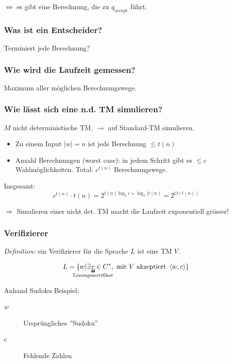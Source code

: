$\Leftrightarrow$ es gibt eine Berechnung, die zu $q_\text{accept}$ führt.

\subsubsection{Was ist ein Entscheider?}

Terminiert jede Berechnung?


\subsubsection{Wie wird die Laufzeit gemessen?}

Maximum aller möglichen Berechnungswege.

\subsubsection{Wie lässt sich eine n.d. TM simulieren?}

$M$ nicht deterministische TM. $\longrightarrow$ auf Standard-TM simulieren.


\begin{itemize}
	\item Zu einem Input $|w| = n$ ist jede Berechnung $\leq t(n)$
	\item Anzahl Berechnungen (worst case): in jedem Schritt gibt es $\leq c$ Wahlmöglichkeiten. Total: $c^{t(n)}$ Berechnungswege.
\end{itemize}

Insgesamt: \[
	c^{t(n)} \cdot t(n) = 2^{t(n) \log_2 c + \log_2(t(n)} = 2^{O(t(n))}
\]

$\Rightarrow$ Simulieren einer nicht det. TM macht die Laufzeit exponentiell grösser!

\subsubsection{Verifizierer}

\emph{Definition:} ein Verifizierer für die Sprache $L$ ist eine TM $V$.

\[
	L = \{ w | \exists \underbracket{c}_{\mathclap{\text{Lösungszertifikat}}} \in C^\ast, \text{ mit } V \text{ akzeptiert } \left< w,c \right> \}
\]

Anhand Sudoku Beispiel:
\begin{description}
\item[$w$] Ursprüngliches ''Sudoku''
\item[$c$] Fehlende Zahlen
\end{description}

